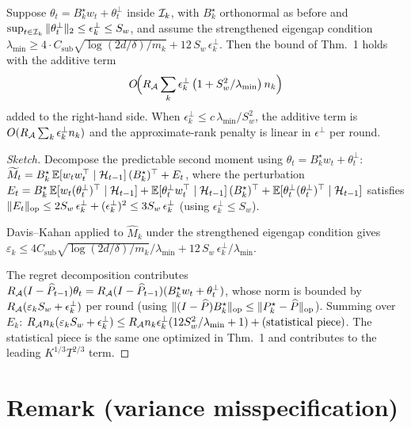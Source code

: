 \begin{corollary}
\label{cor:misspec}
Suppose $\theta_t = B_k^\star w_t + \theta_t^{\perp}$ inside $\mathcal{I}_k$,
with $B_k^\star$ orthonormal as before and
$\sup_{t\in\mathcal{I}_k}\|\theta_t^\perp\|_2\le\epsilon_k^\perp \le S_w$,
and assume the strengthened eigengap condition
$\lambda_{\min}\ge 4\cdot C_{\mathrm{sub}}\sqrt{\log(2d/\delta)/m_k}
+ 12\,S_w\,\epsilon_k^\perp$.
Then the bound of Thm.~1 holds with the additive term
\[
O\!\Bigl(R_{\mathcal{A}}\sum_k \epsilon_k^\perp\,\bigl(1 + S_w^2/\lambda_{\min}\bigr)\, n_k\Bigr)
\]
added to the right-hand side. When $\epsilon_k^\perp \le c\,\lambda_{\min}/S_w^2$,
the additive term is $O(R_{\mathcal{A}}\sum_k \epsilon_k^\perp n_k)$ and the
approximate-rank penalty is linear in $\epsilon^\perp$ per round.
\end{corollary}
\begin{proof}[Sketch]
Decompose the predictable second moment using $\theta_t=B_k^\star w_t+\theta_t^\perp$:
$\widetilde M_t = B_k^\star\,\mathbb E[w_tw_t^\top\mid\mathcal{H}_{t-1}]\,(B_k^\star)^\top + E_t$,
where the perturbation
$E_t = B_k^\star\,\mathbb E[w_t(\theta_t^\perp)^\top\mid\mathcal{H}_{t-1}]
+ \mathbb E[\theta_t^\perp w_t^\top\mid\mathcal{H}_{t-1}]\,(B_k^\star)^\top
+ \mathbb E[\theta_t^\perp(\theta_t^\perp)^\top\mid\mathcal{H}_{t-1}]$
satisfies $\|E_t\|_{\mathrm{op}}\le 2 S_w\,\epsilon_k^\perp + (\epsilon_k^\perp)^2
\le 3 S_w\,\epsilon_k^\perp$ (using $\epsilon_k^\perp\le S_w$).

Davis--Kahan applied to $\widehat M_k$ under the strengthened eigengap
condition gives
$\varepsilon_k\le 4 C_{\mathrm{sub}}\sqrt{\log(2d/\delta)/m_k}/\lambda_{\min}
+ 12\,S_w\,\epsilon_k^\perp/\lambda_{\min}$.

The regret decomposition contributes
$R_{\mathcal{A}}(I-\widehat P_{t-1})\theta_t = R_{\mathcal{A}}(I-\widehat P_{t-1})
(B_k^\star w_t + \theta_t^\perp)$, whose norm is bounded by
$R_{\mathcal{A}}(\varepsilon_k S_w + \epsilon_k^\perp)$ per round (using
$\|(I-\widehat P)B_k^\star\|_{\mathrm{op}}\le\|P_k^\star-\widehat P\|_{\mathrm{op}}$). Summing
over $E_k$:
$R_{\mathcal{A}} n_k (\varepsilon_k S_w + \epsilon_k^\perp)
\le R_{\mathcal{A}} n_k \epsilon_k^\perp(12 S_w^2/\lambda_{\min} + 1) + (\text{statistical piece})$.
The statistical piece is the same one optimized in Thm.~1 and
contributes to the leading $K^{1/3}T^{2/3}$ term.
\end{proof}

\section*{Remark (variance misspecification)}

